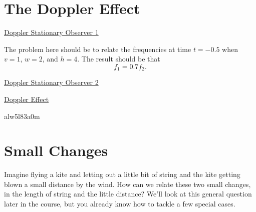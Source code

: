 \documentclass{ximera}
\begin{document}
\section*{The Doppler Effect}

\begin{onlineOnly}
    \begin{center}
\end{center}
\end{onlineOnly}

\href{https://www.desmos.com/calculator/zk06s3k6q4}{Doppler Stationary Observer 1}


The problem here should be to relate the frequencies at time $t=-0.5$ when $v=1$, $w=2$, and $h=4$. The result should be that 
\[
    f_1 = 0.7 f_2 . 
\]


\begin{onlineOnly}
    \begin{center}
\end{center}
\end{onlineOnly}

\href{https://www.desmos.com/calculator/sviyndbyt9}{Doppler Stationary Observer 2}




\begin{onlineOnly}
    \begin{center}
\end{center}
\end{onlineOnly}

\href{https://www.desmos.com/calculator/alw5l83a0m}{Doppler Effect}


alw5l83a0m


\section*{Small Changes}
Imagine flying a kite and letting out a little bit of string and the kite getting blown a small distance by the wind. How can we relate these two small changes, in the length of string and the little distance? We'll look at this general question later in the course, but you already know how to tackle a few special cases.
\end{document}
